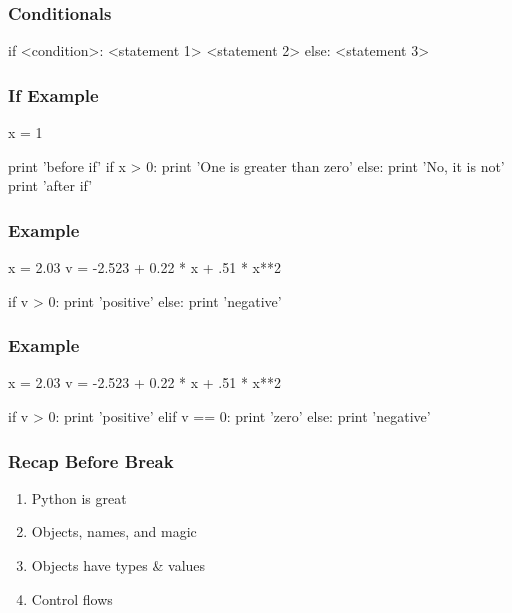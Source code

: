 \begin{frame}[fragile]
\frametitle{Conditionals}

\begin{python}

if <condition>:
    <statement 1>
    <statement 2>
else:
    <statement 3>

\end{python}
\end{frame}

\begin{frame}[fragile]
\frametitle{If Example}

\begin{python}
x = 1

print 'before if'
if x > 0:
    print 'One is greater than zero'
else:
    print 'No, it is not'
print 'after if'

\end{python}

\end{frame}


\begin{frame}[fragile]
\frametitle{Example}

\begin{python}
x = 2.03
v = -2.523 + 0.22 * x  + .51 * x**2

if v > 0:
    print 'positive'
else:
    print 'negative'
\end{python}

\end{frame}

\begin{frame}[fragile]
\frametitle{Example}

\begin{python}
x = 2.03
v = -2.523 + 0.22 * x  + .51 * x**2

if v > 0:
    print 'positive'
elif v == 0:
    print 'zero'
else:
    print 'negative'
\end{python}

\end{frame}

\begin{frame}[fragile]
\frametitle{Recap Before Break}

\begin{enumerate}
\item Python is great
\item Objects, names, and magic
\item Objects have types \& values
\item Control flows
\end{enumerate}

\end{frame}


